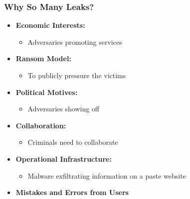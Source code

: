 \documentclass[aspectratio=169]{beamer}
\begin{document}
\begin{frame}
    \frametitle{Why So Many Leaks?}
    \begin{itemize}
        \item \textbf{Economic Interests:} 
        \begin{itemize}
            \item Adversaries promoting services
        \end{itemize}
        \item \textbf{Ransom Model:} 
        \begin{itemize}
            \item To publicly pressure the victims
        \end{itemize}
        \item \textbf{Political Motives:} 
        \begin{itemize}
            \item Adversaries showing off
        \end{itemize}
        \item \textbf{Collaboration:} 
        \begin{itemize}
            \item Criminals need to collaborate
        \end{itemize}
        \item \textbf{Operational Infrastructure:} 
        \begin{itemize}
            \item Malware exfiltrating information on a paste website
        \end{itemize}
        \item \textbf{Mistakes and Errors from Users}
    \end{itemize}
\end{frame}
\end{document}
